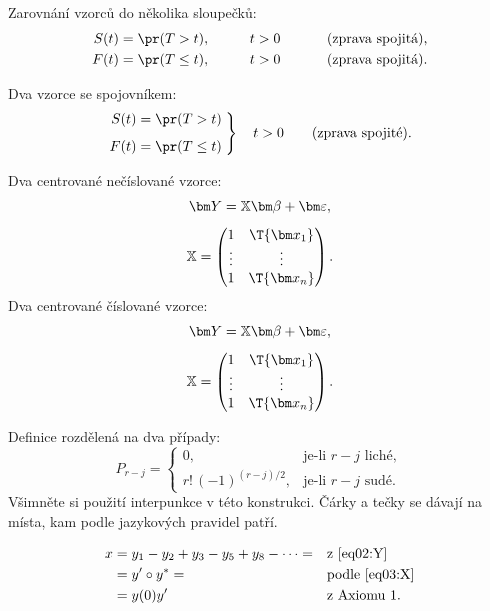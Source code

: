 Zarovnání vzorců do několika sloupečků:
\begin{alignat*}{3}
S(t) &= \pr(T > t),    &\qquad t&>0       &\qquad&\text{ (zprava spojitá),}\\
F(t) &= \pr(T \leq t), &\qquad t&>0       &\qquad&\text{ (zprava spojitá).}
\end{alignat*}

Dva vzorce se spojovníkem:
\begin{equation}\label{eq01:FS}
\left.
\begin{aligned}
S(t) &= \pr(T > t) \\[1ex]
F(t) &= \pr(T \leq t)
\end{aligned}
\;	%
\right\}
\quad t>0 \qquad \text{(zprava spojité).}
\end{equation}

Dva centrované nečíslované vzorce:
\begin{gather*}
\bm Y = \mathbb{X}\bm\beta + \bm\varepsilon, \\[1ex]
\mathbb{X} = \begin{pmatrix} 1 & \T{\bm x_1} \\ \vdots & \vdots \\ 1 &
  \T{\bm x_n} \end{pmatrix}.
\end{gather*}
Dva centrované číslované vzorce:
\begin{gather}
\bm Y = \mathbb{X}\bm\beta + \bm\varepsilon, \label{eq02:Y}\\[1ex]
\mathbb{X} = \begin{pmatrix} 1 & \T{\bm x_1} \label{eq03:X}\\ \vdots & \vdots \\ 1 &
  \T{\bm x_n} \end{pmatrix}.
\end{gather}

Definice rozdělená na dva případy:
\[
P_{r-j}=
\begin{cases}
0, & \text{je-li $r-j$ liché},\\
r!\,(-1)^{(r-j)/2}, & \text{je-li $r-j$ sudé}.
\end{cases}
\]
Všimněte si použití interpunkce v této konstrukci. Čárky a tečky se
dávají na místa, kam podle jazykových pravidel patří.

\begin{align}
x& = y_1-y_2+y_3-y_5+y_8-\dots = && \text{z \eqref{eq02:Y}} \nonumber\\
& = y'\circ y^* = && \text{podle \eqref{eq03:X}} \nonumber\\
& = y(0) y' && \text {z Axiomu 1.}
\end{align}


